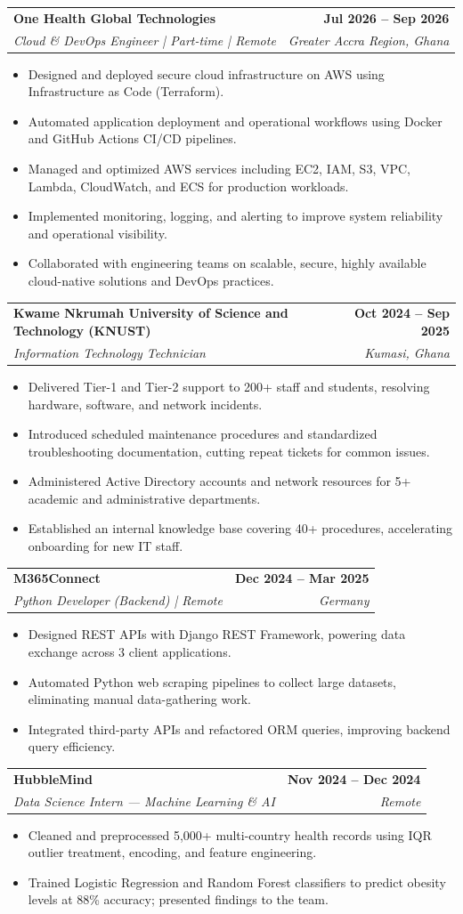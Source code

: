 \documentclass[letterpaper,11pt]{article}
\makeatletter
\newcommand{\resumeItem}[1]{\item\small{#1\vspace{-1pt}}}
\newcommand{\resumeSubheading}[4]{%
  \vspace{-2pt}\item
  \begin{tabular*}{1.0\textwidth}[t]{l@{\extracolsep{\fill}}r}
    \textbf{#1} & \textbf{\small #2} \\
    \textit{\small #3} & \textit{\small #4} \\
  \end{tabular*}\vspace{-7pt}
}
\newcommand{\resumeItemListStart}{\begin{itemize}[leftmargin=0.15in]}
\newcommand{\resumeItemListEnd}{\end{itemize}\vspace{-5pt}}
\makeatother
\begin{document}
  \resumeSubheading
    {One Health Global Technologies}{Jul 2026 -- Sep 2026}
    {Cloud \& DevOps Engineer | Part-time | Remote}{Greater Accra Region, Ghana}
  \resumeItemListStart
    \resumeItem{Designed and deployed secure cloud infrastructure on AWS using Infrastructure as Code (Terraform).}
    \resumeItem{Automated application deployment and operational workflows using Docker and GitHub Actions CI/CD pipelines.}
    \resumeItem{Managed and optimized AWS services including EC2, IAM, S3, VPC, Lambda, CloudWatch, and ECS for production workloads.}
    \resumeItem{Implemented monitoring, logging, and alerting to improve system reliability and operational visibility.}
    \resumeItem{Collaborated with engineering teams on scalable, secure, highly available cloud-native solutions and DevOps practices.}
  \resumeItemListEnd

  \resumeSubheading
    {Kwame Nkrumah University of Science and Technology (KNUST)}{Oct 2024 -- Sep 2025}
    {Information Technology Technician}{Kumasi, Ghana}
  \resumeItemListStart
    \resumeItem{Delivered Tier-1 and Tier-2 support to 200+ staff and students, resolving hardware, software, and network incidents.}
    \resumeItem{Introduced scheduled maintenance procedures and standardized troubleshooting documentation, cutting repeat tickets for common issues.}
    \resumeItem{Administered Active Directory accounts and network resources for 5+ academic and administrative departments.}
    \resumeItem{Established an internal knowledge base covering 40+ procedures, accelerating onboarding for new IT staff.}
  \resumeItemListEnd

  \resumeSubheading
    {M365Connect}{Dec 2024 -- Mar 2025}
    {Python Developer (Backend) | Remote}{Germany}
  \resumeItemListStart
    \resumeItem{Designed REST APIs with Django REST Framework, powering data exchange across 3 client applications.}
    \resumeItem{Automated Python web scraping pipelines to collect large datasets, eliminating manual data-gathering work.}
    \resumeItem{Integrated third-party APIs and refactored ORM queries, improving backend query efficiency.}
  \resumeItemListEnd

  \resumeSubheading
    {HubbleMind}{Nov 2024 -- Dec 2024}
    {Data Science Intern — Machine Learning \& AI}{Remote}
  \resumeItemListStart
    \resumeItem{Cleaned and preprocessed 5,000+ multi-country health records using IQR outlier treatment, encoding, and feature engineering.}
    \resumeItem{Trained Logistic Regression and Random Forest classifiers to predict obesity levels at 88\% accuracy; presented findings to the team.}
  \resumeItemListEnd
\end{document}
